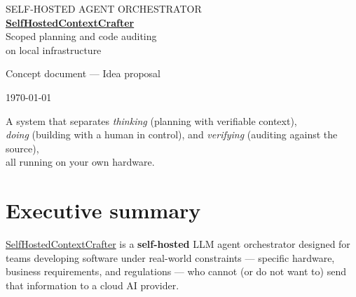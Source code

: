\documentclass[11pt]{article}
\begin{document}
\begin{titlepage}
\centering
\vspace*{2.2cm}

{\color{softGray}\large SELF-HOSTED AGENT ORCHESTRATOR}\\[0.6cm]

{\Huge\bfseries\color{inkNavy} \href{https://github.com/dramirezbe/SelfHostedContextCrafter}{SelfHostedContextCrafter}}\\[0.5cm]

{\Large\color{accentTeal} Scoped planning and code auditing\\ on local infrastructure}

\vspace{1.8cm}


\vspace{1.8cm}

{\large\color{softGray} Concept document --- Idea proposal}

\vspace{0.4cm}

{\color{softGray} \today}

\vfill

{\small\color{softGray} A system that separates \emph{thinking} (planning with verifiable context),\\ \emph{doing} (building with a human in control), and \emph{verifying} (auditing against the source),\\ all running on your own hardware.}

\end{titlepage}

\section*{Executive summary}

\href{https://github.com/dramirezbe/SelfHostedContextCrafter}{SelfHostedContextCrafter} is a \textbf{self-hosted} LLM agent orchestrator designed for teams developing software under real-world constraints --- specific hardware, business requirements, and regulations --- who cannot (or do not want to) send that information to a cloud AI provider.
\end{document}
